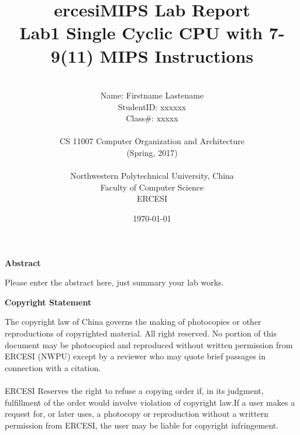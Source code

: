 \documentclass[a4paper]{article}
\begin{document}
\title{{\Huge ercesiMIPS Lab Report{\large\linebreak\\}}{\Large Lab1 Single Cyclic CPU with 7-9(11) MIPS Instructions\linebreak\linebreak}}
\author{\\Name: Firstname Lastename\\
StudentID: xxxxxx\\
Class\#: xxxxx\\\\
CS 11007 Computer Organization and Architecture\\
(Spring, 2017)\\\\
Northwestern Polytechnical University, China\\
Faculty of Computer Science\\
ERCESI}
\date{\today}
\maketitle
\newpage

\begin{center}
{\large\bf{Abstract\\}}
\end{center}
Please enter the abstract here, just summary your lab works.
\newpage
\begin{center}
{\large\bf{Copyright Statement\\}}
\end{center}
The copyright law of China governs the making of photocopies or other reproductions of copyrighted material. All right reserved. No portion of this document may be photocopied and reproduced without written permission from ERCESI (NWPU) except by a reviewer who may quote brief passages in connection with a citation. \\\\
ERCESI Reserves the right to refuse a copying order if, in its judgment, fulfillment of the order would involve violation of copyright law.If a user makes a request for, or later uses, a photocopy or reproduction without a writtern permission from ERCESI, the user may be liable for copyright infringement.\newpage
\tableofcontents\label{c}
\newpage
\end{document}
